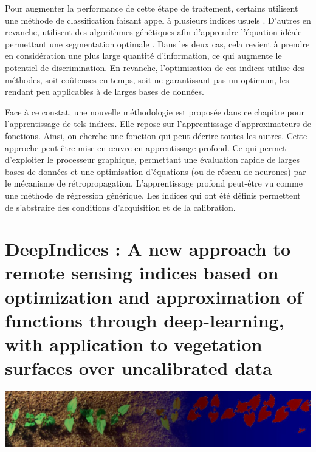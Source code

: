 \documentclass[../thesis.tex]{subfiles}
\begin{document}
    
    Pour augmenter la performance de cette étape de traitement, certains utilisent une méthode de classification faisant appel à plusieurs indices usuels \cite{Shishir2018, Gee2021}. D'autres en revanche, utilisent des algorithmes génétiques afin d'apprendre l'équation idéale permettant une segmentation optimale \cite{GeneticKabiri, GeneticAlbarracin}. Dans les deux cas, cela revient à prendre en considération une plus large quantité d'information, ce qui augmente le potentiel de discrimination. En revanche, l'optimisation de ces indices utilise des méthodes, soit coûteuses en temps, soit ne garantissant pas un optimum, les rendant peu applicables à de larges bases de données.
    
    Face à ce constat, une nouvelle méthodologie est proposée dans ce chapitre pour l'apprentissage de tels indices. Elle repose sur l'apprentissage d'approximateurs de fonctions. Ainsi, on cherche une fonction qui peut décrire toutes les autres. Cette approche peut être mise en œuvre en apprentissage profond. Ce qui permet d'exploiter le processeur graphique, permettant une évaluation rapide de larges bases de données et une optimisation d'équations (ou de réseau de neurones) par le mécanisme de rétropropagation. L'apprentissage profond peut-être vu comme une méthode de régression générique. Les indices qui ont été définis permettent de s'abstraire des conditions d'acquisition et de la calibration. %
	

	\newpage
    \null
    \vfill
	\section*{DeepIndices : A new approach to remote sensing indices based on optimization and approximation of functions through deep-learning, with application to vegetation surfaces over uncalibrated data}
	
	\noindent
	\includegraphics[width=\linewidth]{img/idx/graphical-gca}
	
\end{document}
